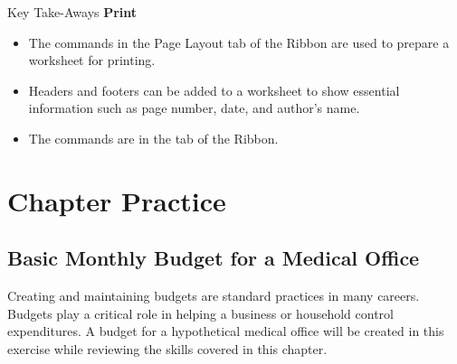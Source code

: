 \begin{center}
	\begin{tkwbox}{Key Take-Aways}
		\textbf{Print}
		\\
		\begin{itemize}
			\setlength{\itemsep}{0pt}
			\setlength{\parskip}{0pt}
			\setlength{\parsep}{0pt}

			\item The commands in the Page Layout tab of the Ribbon are used to prepare a worksheet for printing.
			\item Headers and footers can be added to a worksheet to show essential information such as page number, date, and author's name.
			\item The  commands are in the  tab of the Ribbon.
			
		\end{itemize}
	\end{tkwbox}
\end{center}

\section{Chapter Practice}

\subsection{Basic Monthly Budget for a Medical Office}

Creating and maintaining budgets are standard practices in many careers. Budgets play a critical role in helping a business or household control expenditures. A budget for a hypothetical medical office will be created in this exercise while reviewing the skills covered in this chapter.

